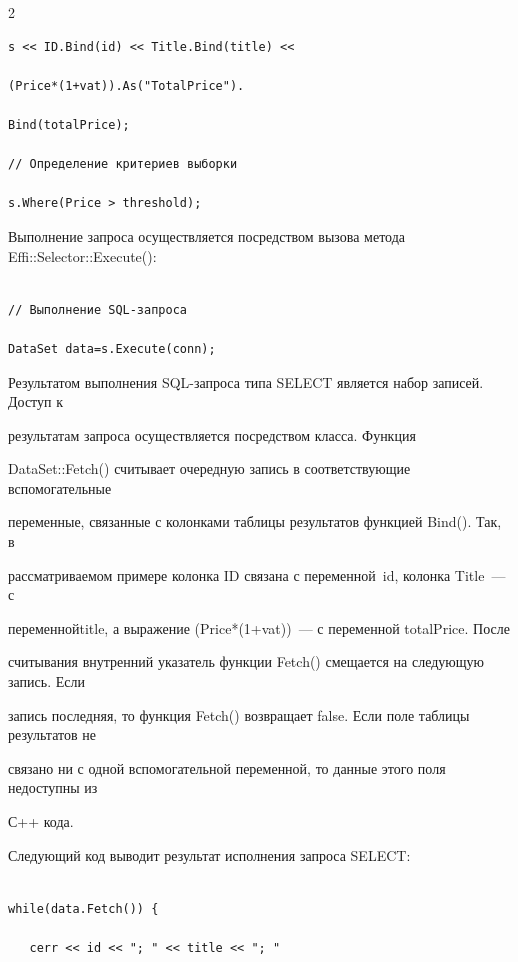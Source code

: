 \begin{multicols}{2}
{\begin{verbatim}
s << ID.Bind(id) << Title.Bind(title) << 

(Price*(1+vat)).As("TotalPrice"). 

Bind(totalPrice);

// Определение критериев выборки

s.Where(Price > threshold);

\end{verbatim}}



Выполнение запроса осуществляется посредством вызова метода {\sf Effi::Selector::Execute()}: 

\begin{verbatim}

// Выполнение SQL-запроса

DataSet data=s.Execute(conn);

\end{verbatim}

Результатом выполнения SQL-за\-про\-са типа SELECT является набор записей. Доступ к 

результатам запроса осуществляется посредством класса. Функция 

{\sf DataSet::Fetch()} считывает очередную запись в соответствующие вспомогательные 

переменные, связанные с колонками табли\-цы результатов функцией {\sf Bind()}. Так, в 

рассмат\-ри\-ваемом примере колонка {\sf ID} связана с переменной~id, колонка {\sf Title}~--- с 

переменной\linebreak title, а выражение ({\sf Price*(1+vat)})~--- с переменной totalPrice. После 

считывания внутренний указатель функции {\sf Fetch()} смещается на следующую запись. Если 

запись последняя, то функция {\sf Fetch()} возвращает false. Если поле таблицы результатов не 

связано ни с одной вспомогательной переменной, то данные этого поля недоступны из 

С++ кода.



Следующий код выводит результат исполнения запроса SELECT: 

\begin{verbatim}

while(data.Fetch()) {

   cerr << id << "; " << title << "; " 


\end{verbatim}
\end{multicols}
